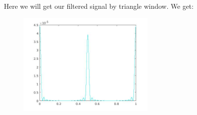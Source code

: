 \documentclass[a4paper,11pt]{article}
\begin{document}
Here we will get our filtered signal by triangle window. We get:

\begin{figure}[!hp]
    \begin{center}
      \includegraphics[width=0.6\textwidth]{images/lab2_68.jpg}
    \end{center}
\end{figure}
\end{document}
